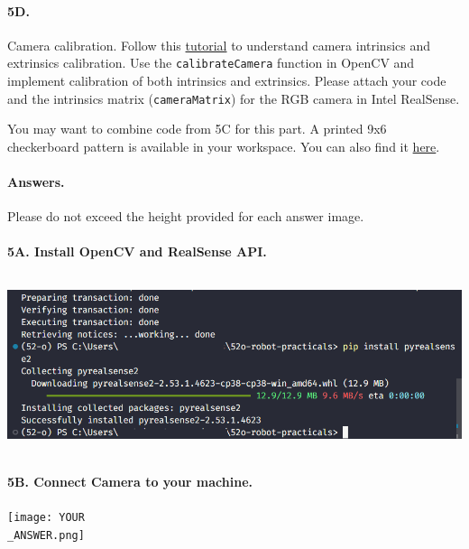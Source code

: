 \paragraph{5D.} Camera calibration.
Follow this \href{https://docs.opencv.org/3.4/dc/dbb/tutorial_py_calibration.html}{tutorial} to understand camera intrinsics and extrinsics calibration.
Use the \texttt{calibrateCamera} function in OpenCV and implement calibration of both intrinsics and extrinsics.
Please attach your code and the intrinsics matrix (\texttt{cameraMatrix}) for the RGB camera in Intel RealSense.

You may want to combine code from 5C for this part.
A printed 9x6 checkerboard pattern is available in your workspace.
You can also find it \href{https://drive.google.com/file/d/1Hk-U4xiAmZnrf3qGziQWBW7YbEMFTWgY/view?usp=sharing}{here}.
 
\newpage
\paragraph{Answers.}
Please do not exceed the height provided for each answer image.


\paragraph{5A. Install OpenCV and RealSense API.}
\begin{center}
    \includegraphics[height=2in]{image/5a_vision.png}
\end{center}

\paragraph{5B. Connect Camera to your machine.}
\begin{center}
    \texttt{[image: YOUR\\\_ANSWER.png]}
\end{center}

